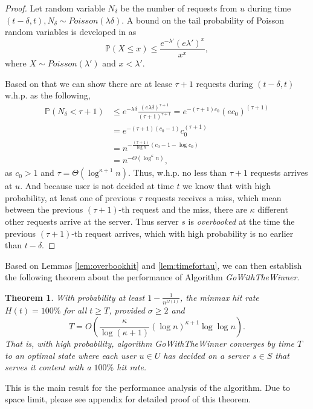 \documentclass[conference]{IEEEtran}
\newtheorem{theorem}{Theorem}
\newcommand{\prob}[1]{\mathbb{P}\left( #1 \right)}
\begin{document}
\begin{proof}
Let random variable $N_{\delta}$ be the number of requests from $u$ during time $(t-\delta, t), N_{\delta}\sim Poisson(\lambda\delta)$.
A bound on the tail probability of Poisson random variables is developed in \cite{PoissonTailBound} as
$$
	\prob{X\leq x} \leq \frac{e^{-\lambda'}(e\lambda')^x}{x^x},
$$
where $X\sim Poisson(\lambda')$ and $x<\lambda'$.

Based on that we can show there are at lease $\tau+1$ requests during $(t-\delta,t)$ w.h.p. as the following,
\begin{align*}
\prob{N_{\delta} < \tau+1} & \leq e^{-\lambda\delta}\frac{(e\lambda\delta)^{\tau+1}}{(\tau+1)^{\tau+1}} = e^{-(\tau+1) c_{0}}(ec_0)^{(\tau+1)}\\
	& = e^{-(\tau+1)(c_0-1)}c_0^{(\tau+1)}\\
	& = n^{-\frac{(\tau+1)}{\log n}(c_0 - 1 - \log c_0)}\\
	& = n^{-\Theta(\log^{\kappa}n)},
\end{align*}
as $c_0>1$ and $\tau= \Theta(\log^{\kappa+1}n)$. Thus, w.h.p. no less than $\tau+1$ requests arrives at $u$. And because user is not decided at time $t$ we know that with high probability, at least one of previous $\tau$ requests receives a miss, which mean between the previous $(\tau+1)$-th request and the miss, there are $\kappa$ different other requests arrive at the server. Thus server $s$ is \textsl{overbooked} at the time the previous $(\tau+1)$-th request arrives, which with high probability is no earlier than $t-\delta$.
\end{proof}

Based on Lemmas \ref{lem:overbookhit} and \ref{lem:timefortau}, we can then establish the following theorem about the performance of Algorithm \textsl{GoWithTheWinner}.

\begin{theorem}
\label{thm:hitrate}
With probability at least $1 - \frac{1}{n^{\Omega(1)}}$,  the minmax hit rate $H(t) = 100\%$ for all $t \geq T$, provided $\sigma \geq 2$ and 
$$T = O(\frac{\kappa}{\log (\kappa + 1)} (\log n)^{\kappa+1} \log\log n).$$
 That is,  with high probability, 
 algorithm \textsl{GoWithTheWinner} converges by time $T$ to an optimal state where each user $u \in U$ has decided on a server $s \in S$ that serves it content with a $100\%$ hit rate. 
\end{theorem}

This is the main result for the performance analysis of the algorithm. Due to space limit, please see appendix for detailed proof of this theorem. 
\end{document}

